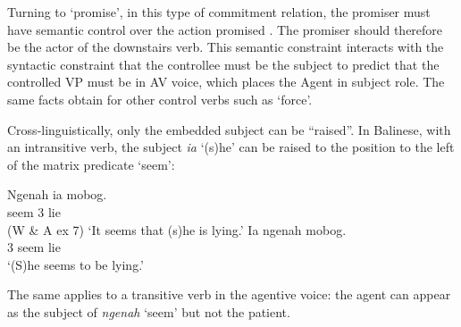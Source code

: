 \documentclass[output=paper
                ,modfonts
                ,nonflat
	        ,collection
	        ,collectionchapter
	        ,collectiontoclongg
 	        ,biblatex
                ,babelshorthands
                ,newtxmath
                ,draftmode
                ,colorlinks, citecolor=brown
]{./langsci/langscibook}
\begin{document}
Turning to  `promise', in this type of commitment relation, the promiser must have semantic control over the action promised \citep{Farkas1988,Kroeger1993,SagandPollard1991}. The promiser should therefore be the actor of the downstairs verb. This semantic constraint interacts with the syntactic constraint that the controllee must be the subject to predict that the controlled VP must be in AV voice, which places the Agent in subject role. The same facts obtain for other control verbs such as  `force'.

\eal
{}
\zl

Cross-linguistically, only the embedded subject can be ``raised''. In Balinese, with an intransitive verb, the subject \emph{ia} `(s)he' can be raised to the position to the left of the matrix predicate  `seem':

\begin{exe}
\ex \begin{xlist}
\ex 
\gll Ngenah ia mobog.\\
     seem 3 lie\\\hfill(W \& A ex 7)
\glt `It seems that (s)he is lying.'
\ex 
\gll  Ia ngenah mobog.\\
      3 seem lie\\
\glt `(S)he seems to be lying.'
\end{xlist}
\end{exe}

The same applies to a transitive verb in the agentive voice: the agent can appear as the subject of \emph{ngenah} `seem' but not the patient.

\eal
{}
\zl
\end{document}
